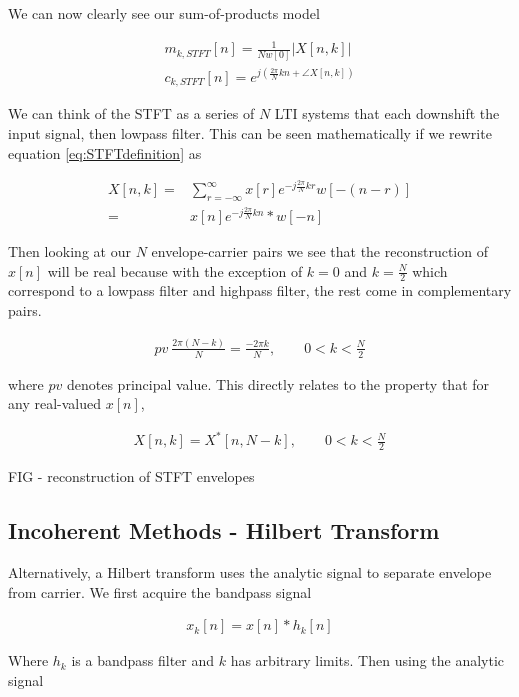 \documentclass [11pt, proquest] {uwthesis}[2015/03/03]
\begin{document}
We can now clearly see our sum-of-products model

\begin{align}
\label{eq:envelope_STFT}
m_{k,STFT}[n] =  \frac{1}{Nw[0]}  \vert X[n,k]\vert \\
c_{k,STFT}[n] = e^{j(\frac{2\pi}{N}kn + \angle X[n,k])}
\end{align}

We can think of the STFT as a series of $N$ LTI systems that each downshift the input signal, then lowpass filter.  This can be seen mathematically if we rewrite equation \ref{eq:STFTdefinition} as

\begin{align}
\label{eq:STFTasFilter}
X[n,k] =& \sum\limits_{r=-\infty}^{\infty} x[r] e^{-j\frac{2\pi}{N}kr} w[-(n - r)] \nonumber \\
=& x[n] e^{-j\frac{2\pi}{N}kn} * w[-n]
\end{align}

Then looking at our $N$ envelope-carrier pairs we see that the reconstruction of $x[n]$ will be real because with the exception of $k = 0$ and $k = \frac{N}{2}$ which correspond to a lowpass filter and highpass filter, the rest come in complementary pairs.

\begin{align}
pv \ \frac{2\pi (N-k)}{N} = \frac{-2\pi k}{N}, \qquad 0 < k < \frac{N}{2}
\end{align}

where $pv$ denotes principal value.  This directly relates to the property that for any real-valued $x[n]$,

\begin{align}
X[n,k] = X^*[n,N-k], \qquad 0 < k < \frac{N}{2}
\end{align}

FIG - reconstruction of STFT envelopes

\subsection{Incoherent Methods - Hilbert Transform}

Alternatively, a Hilbert transform uses the analytic signal to separate envelope from carrier.  We first acquire the bandpass signal

\begin{align}
x_k[n] = x[n] * h_k[n]
\end{align}

Where $h_k$ is a bandpass filter and $k$ has arbitrary limits.  Then using the analytic signal
\end{document}
